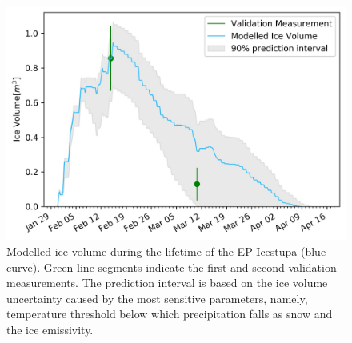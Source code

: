 \documentclass[utf8]{frontiersSCNS} %
\begin{document}
  \begin{figure} \begin{center} \includegraphics[width=15 cm]{Figures/Figure_8.jpg} \end{center} \caption{Modelled ice
  volume during the lifetime of the EP Icestupa (blue curve). Green line segments indicate the first and second
validation measurements. The prediction interval is based on the ice volume uncertainty caused by the most sensitive
parameters, namely, temperature threshold below which precipitation falls as snow and the ice emissivity.}
\label{fig:results} \end{figure}
%   
% 
% 
\end{document}
